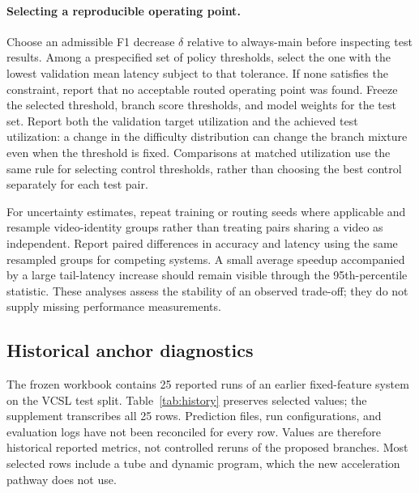 \paragraph{Selecting a reproducible operating point.}
Choose an admissible F1 decrease $\delta$ relative to always-main before inspecting test
results. Among a prespecified set of policy thresholds, select the one with the lowest
validation mean latency subject to that tolerance. If none satisfies the constraint,
report that no acceptable routed operating point was found. Freeze the selected threshold,
branch score thresholds, and model weights for the test set. Report both the validation
target utilization and the achieved test utilization: a change in the difficulty distribution
can change the branch mixture even when the threshold is fixed. Comparisons at matched
utilization use the same rule for selecting control thresholds, rather than choosing the
best control separately for each test pair.

For uncertainty estimates, repeat training or routing seeds where applicable and resample
video-identity groups rather than treating pairs sharing a video as independent. Report
paired differences in accuracy and latency using the same resampled groups for competing
systems. A small average speedup accompanied by a large tail-latency increase should remain
visible through the 95th-percentile statistic. These analyses assess the stability of an
observed trade-off; they do not supply missing performance measurements.

\subsection{Historical anchor diagnostics}
\label{sec:history}
The frozen workbook contains 25 reported runs of an earlier fixed-feature system on the VCSL
test split. Table~\ref{tab:history} preserves selected values; the supplement transcribes all
25 rows. Prediction files, run configurations, and evaluation logs have not been reconciled
for every row. Values are therefore historical reported metrics, not controlled reruns of
the proposed branches. Most selected rows include a tube and dynamic program, which the
new acceleration pathway does not use.

